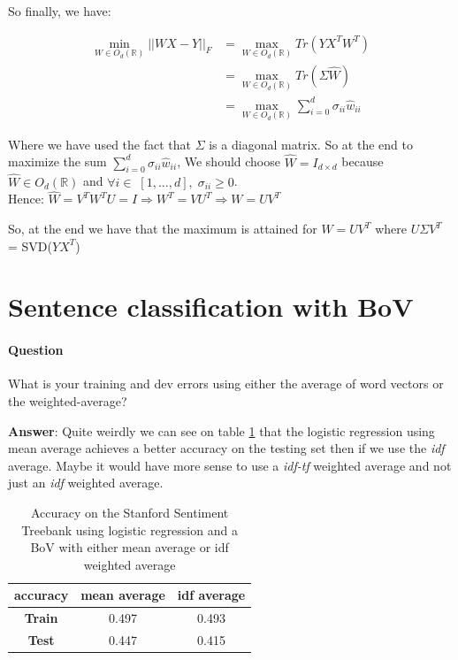 \documentclass[11pt]{article}
\numberwithin{figure}{section} %
\begin{document}
So finally, we have:

\begin{align*}
	\min\limits_{W \in O_d(\mathbb{R})} ||WX - Y||_F &= \max\limits_{W \in O_d(\mathbb{R})} Tr(YX^TW^T) \\
	&= \max\limits_{W \in O_d(\mathbb{R})} Tr(\Sigma \widehat{W}) \\
	&= \max\limits_{W \in O_d(\mathbb{R})} \sum\limits_{i = 0}^d \sigma_{ii} \widehat{w}_{ii}
\end{align*}

Where we have used the fact that $\Sigma$ is a diagonal matrix. So at the end to maximize the sum $\sum\limits_{i=0}^d \sigma_{ii} \widehat{w}_{ii}$, We should choose
$\widehat{W} = I_{d \times d}$ because $\widehat{W} \in O_d(\mathbb{R})$ and $\forall i \in \; [1,\hdots, d],\; \sigma_{ii} \geq 0$. \\

Hence: $\widehat{W} = V^T W^T U = I \Rightarrow W^T = V U^T \Rightarrow W = U V^T$

So, at the end we have that the maximum is attained for $W = UV^T$ where $U \Sigma V^T$ = SVD($YX^T$)

\section{Sentence classification with BoV}
\paragraph{Question} What is your training and dev errors using either the average of
word vectors or the weighted-average?

\textbf{Answer}: Quite weirdly we can see on table \ref{table:acc} that the logistic regression using mean average achieves a better accuracy on the testing
set then if we use the \emph{idf} average. Maybe it would have more sense to use a \emph{idf-tf} weighted average and not just an \emph{idf} weighted average.
\begin{table}[h]
\centering
\begin{tabular}{|c|c|c|}
\hline
\textbf{accuracy} & \textbf{mean average} & \textbf{idf average} \\ \hline
\textbf{Train} & 0.497 & 0.493 \\ \hline
\textbf{Test} & 0.447 & 0.415 \\ \hline
\end{tabular}
\caption{Accuracy on the Stanford Sentiment Treebank using logistic regression and a BoV with either mean average or idf weighted average}
\label{table:acc}
\end{table}
\end{document}
